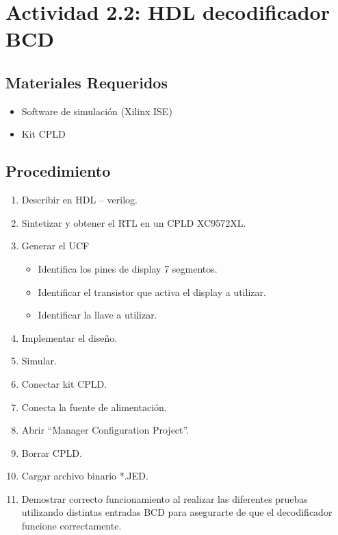 \section{Actividad 2.2: HDL decodificador BCD}

\subsection{Materiales Requeridos}
\begin{itemize}
    \item Software de simulación (Xilinx ISE)
    \item Kit CPLD
\end{itemize}

\subsection{Procedimiento}

\begin{enumerate}
    \item Describir en HDL – verilog.
    \item Sintetizar y obtener el RTL en un CPLD XC9572XL.
    \item Generar el UCF
    \begin{itemize}
        \item Identifica los pines de display 7 segmentos.
        \item Identificar el transistor que activa el display a utilizar.
        \item Identificar la llave a utilizar.
    \end{itemize}
    \item Implementar el diseño.
    \item Simular.
    \item Conectar kit CPLD.
    \item Conecta la fuente de alimentación.
    \item Abrir “Manager Configuration Project”.
    \item Borrar CPLD.
    \item Cargar archivo binario *.JED.
    \item Demostrar correcto funcionamiento al realizar las diferentes pruebas utilizando distintas entradas BCD para asegurarte de que el decodificador funcione correctamente.
\end{enumerate}